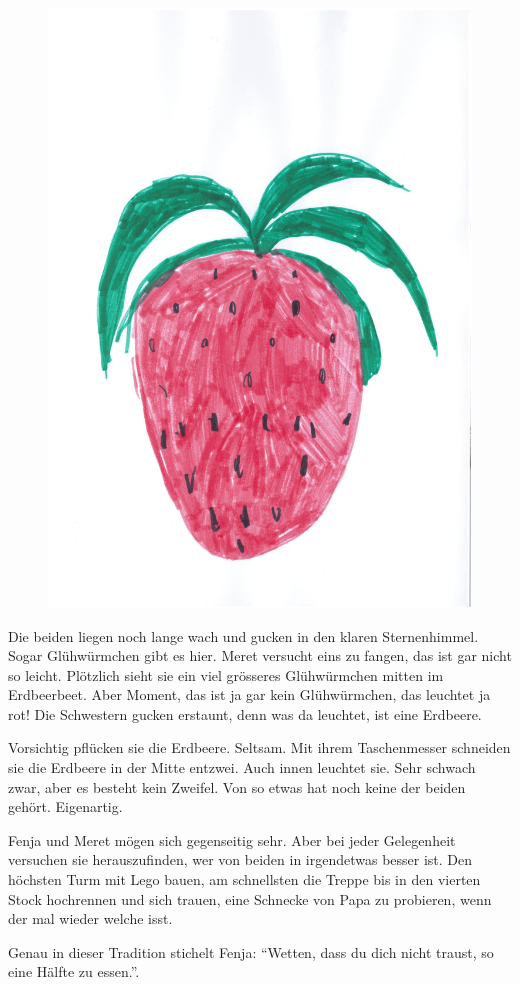 \begin{figure}[hb]
\centering
\includegraphics[width=.7\textwidth]{bilder/opa1.pdf}
\end{figure}


Die beiden liegen noch lange wach und gucken in den klaren Sternenhimmel. Sogar Glühwürmchen gibt es hier. Meret versucht eins zu fangen, das ist gar nicht so leicht. Plötzlich sieht sie ein viel grösseres Glühwürmchen mitten im Erdbeerbeet. Aber Moment, das ist ja gar kein Glühwürmchen, das leuchtet ja rot! Die Schwestern gucken erstaunt, denn was da leuchtet, ist eine Erdbeere.

Vorsichtig pflücken sie die Erdbeere. Seltsam. Mit ihrem Taschenmesser schneiden sie die Erdbeere in der Mitte entzwei. Auch innen leuchtet sie. Sehr schwach zwar, aber es besteht kein Zweifel. Von so etwas hat noch keine der beiden gehört. Eigenartig. 

Fenja und Meret mögen sich gegenseitig sehr. Aber bei jeder Gelegenheit versuchen sie herauszufinden, wer von beiden in irgendetwas besser ist. Den höchsten Turm mit Lego bauen, am schnellsten die Treppe bis in den vierten Stock hochrennen und sich trauen, eine Schnecke von Papa zu probieren, wenn der mal wieder welche isst. 

Genau in dieser Tradition stichelt Fenja: \enquote{Wetten, dass du dich nicht traust, so eine Hälfte zu essen.}. 

